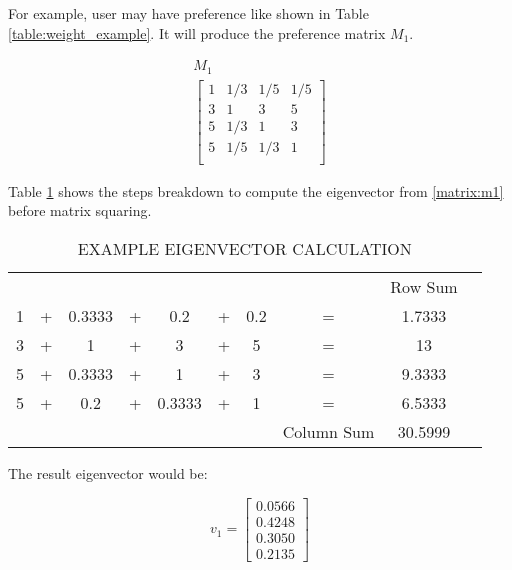 \documentclass[journal]{IEEEtran}
\begin{document}
For example, user may have preference like shown in Table \ref{table:weight_example}. It will produce the preference matrix $M_1$.


\begin{equation}\label{matrix:m1}
\begin{array}{c}
    M_1\\
    \begin{bmatrix}
        1 & 1/3 & 1/5 & 1/5 \\
        3 & 1   & 3   & 5 \\
        5 & 1/3 & 1   & 3 \\
        5 & 1/5 & 1/3 & 1\\
    \end{bmatrix}
\end{array}
\end{equation}


Table \ref{table:example_eigenvector} shows the steps breakdown to compute the eigenvector from \ref{matrix:m1} before matrix squaring.


\begin{table}[h]
\caption{EXAMPLE EIGENVECTOR CALCULATION}
\label{table:example_eigenvector}
\begin{tabular}{cccccccccc}
          &   &        &   &        &   &     &            & Row Sum \\
        1 & + & 0.3333 & + & 0.2    & + & 0.2 & =          & 1.7333  \\
        3 & + & 1      & + & 3      & + & 5   & =          & 13      \\
        5 & + & 0.3333 & + & 1      & + & 3   & =          & 9.3333  \\
        5 & + & 0.2    & + & 0.3333 & + & 1   & =          & 6.5333  \\
          &   &        &   &        &   &     & Column Sum & 30.5999 \\        
\end{tabular}
\end{table}


The result eigenvector would be:

\begin{equation}
\label{eigenvector1}
v_1=
\left[ 
\begin{array}{c} 
0.0566 \\ 
0.4248 \\
0.3050 \\
0.2135
\end{array} 
\right] 
\end{equation}
\end{document}
